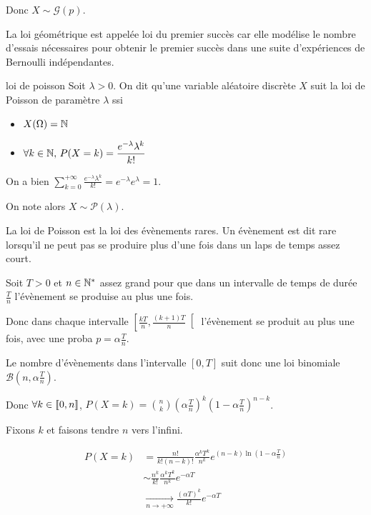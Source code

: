 Donc $X \sim \mathcal G(p)$.

La loi géométrique est appelée loi du premier succès car elle modélise le nombre d'essais nécessaires pour obtenir le premier succès
dans une suite d'expériences de Bernoulli indépendantes.

\begin{definition}{loi de poisson }{}
    Soit $\lambda > 0$. On dit qu'une variable aléatoire discrète $X$ suit la loi de 
    Poisson de paramètre $\lambda$ ssi 
    \begin{itemize}
        \item $X(\Omega) = \mathbb{N}$
        \item $\displaystyle \forall k \in \mathbb{N}, \, P(X = k) = \frac{e^{- \lambda} \lambda^k}{k!}$
    \end{itemize}

    On a bien $\displaystyle \sum_{k = 0}^{+ \infty} \frac{e^{- \lambda} \lambda^k}{k!} = e^{- \lambda} e^{\lambda} = 1$.

    On note alors $X \sim \mathcal P(\lambda)$.
\end{definition}


La loi de Poisson est la loi des évènements rares. Un évènement est dit rare lorsqu'il ne peut pas se produire 
plus d'une fois dans un laps de temps assez court. 

Soit $T > 0$ et $n \in \mathbb{N}^*$ assez grand pour que dans un intervalle de temps de durée 
$\frac T n$ l'évènement se produise au plus une fois. 

Donc dans chaque intervalle $\left[ \frac{kT} n, \frac{(k + 1)T}{n} \right[$ l'évènement se produit au plus
une fois, avec une proba $p = \alpha \frac T n$. 

Le nombre d'évènements dans l'intervalle $[0, T]$ suit donc une loi 
binomiale $\mathcal B\left( n, \alpha \frac T n \right)$.

Donc $\displaystyle \forall k \in [\![0, n]\!]$, $P(X = k) = \binom n k \left( \alpha \frac T n \right)^k \left( 1 - \alpha \frac T n \right)^{n - k}$.

Fixons $k$ et faisons tendre $n$ vers l'infini.

\begin{align}
    P(X = k ) & = \frac{n!}{k! (n - k)!} \frac{\alpha^k T^k}{n^k} e^{(n - k) \ln \left( 1 - \alpha \frac T n \right)} \\
    & \sim \frac{n^k}{k!} \frac{\alpha^k T^k}{n^k} e^{- \alpha T} \\
    & \xrightarrow[n \to + \infty]{} \frac{(\alpha T)^k}{k!} e^{- \alpha T}
\end{align}

